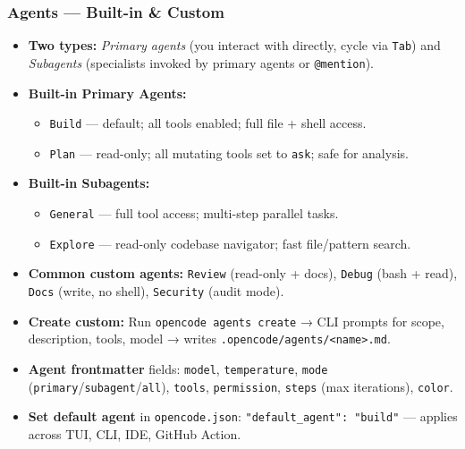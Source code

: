 \begin{frame}[fragile]\frametitle{Agents — Built-in \& Custom}
  \begin{itemize}
    \item \textbf{Two types:} \textit{Primary agents} (you interact with directly, cycle via \texttt{Tab}) and \textit{Subagents} (specialists invoked by primary agents or \texttt{@mention}).
    \item \textbf{Built-in Primary Agents:}
      \begin{itemize}
        \item \texttt{Build} — default; all tools enabled; full file + shell access.
        \item \texttt{Plan} — read-only; all mutating tools set to \texttt{ask}; safe for analysis.
      \end{itemize}
    \item \textbf{Built-in Subagents:}
      \begin{itemize}
        \item \texttt{General} — full tool access; multi-step parallel tasks.
        \item \texttt{Explore} — read-only codebase navigator; fast file/pattern search.
      \end{itemize}
    \item \textbf{Common custom agents:} \texttt{Review} (read-only + docs), \texttt{Debug} (bash + read), \texttt{Docs} (write, no shell), \texttt{Security} (audit mode).
    \item \textbf{Create custom:} Run \texttt{opencode agents create} → CLI prompts for scope, description, tools, model → writes \texttt{.opencode/agents/<name>.md}.
    \item \textbf{Agent frontmatter} fields: \texttt{model}, \texttt{temperature}, \texttt{mode} (\texttt{primary}/\texttt{subagent}/\texttt{all}), \texttt{tools}, \texttt{permission}, \texttt{steps} (max iterations), \texttt{color}.
    \item \textbf{Set default agent} in \texttt{opencode.json}: \texttt{"default\_agent": "build"} — applies across TUI, CLI, IDE, GitHub Action.
  \end{itemize}
\end{frame}

